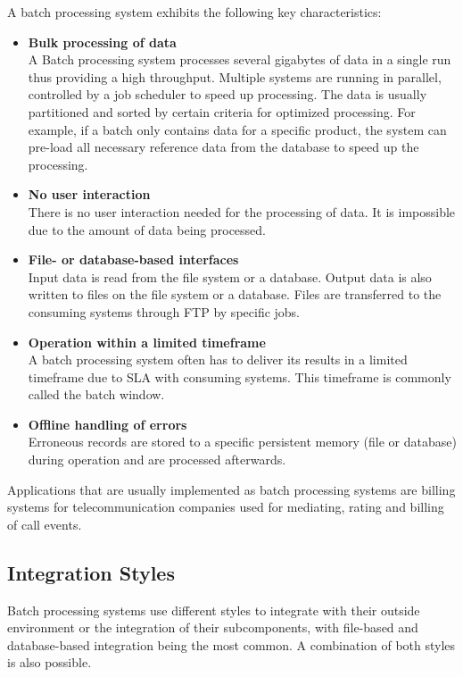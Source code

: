 A batch processing system exhibits the following key characteristics:
\begin{itemize}
	\item \textbf{Bulk processing of data}\\
	A Batch processing system processes several gigabytes of data in a single run thus providing a high throughput. Multiple systems are running in parallel, controlled by a job scheduler to speed up processing. The data is usually partitioned and sorted by certain criteria for optimized processing. For example, if a batch only contains data for a specific product, the system can pre-load all necessary reference data from the database to speed up the processing.
	\item \textbf{No user interaction}\\
	There is no user interaction needed for the processing of data. It is impossible due to the amount of data being processed.
	\item \textbf{File- or database-based interfaces}\\
	Input data is read from the file system or a database. Output data is also written to files on the file system or a database. Files are transferred to the consuming systems through FTP by specific jobs.
	\item \textbf{Operation within a limited timeframe}\\
	A batch processing system often has to deliver its results in a limited timeframe due to \ac{SLA} with consuming systems. This timeframe is commonly called the batch window.
	\item \textbf{Offline handling of errors}\\
	Erroneous records are stored to a specific persistent memory (file or database) during operation and are processed afterwards.
\end{itemize}
Applications that are usually implemented as batch processing systems are billing systems for telecommunication companies used for mediating, rating and billing of call events.

\subsection{Integration Styles}
Batch processing systems use different styles to integrate with their outside environment or the integration of their subcomponents, with file-based and database-based integration being the most common. A combination of both styles is also possible.

